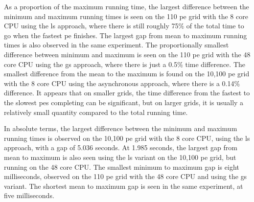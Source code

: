 As a proportion of the maximum running time, the largest difference between the minimum and maximum running times is seen on the 110 \gls{pe} grid with the 8 core CPU using the \gls{ls} approach, where there is still roughly 75\% of the total time to go when the fastest \gls{pe} finishes.  The largest gap from mean to maximum running times is also observed in the same experiment.  The proportionally smallest difference between minimum and maximum is seen on the 110 \gls{pe} grid with the 48 core CPU using the \gls{gs} approach, where there is just a 0.5\% time difference.  The smallest difference from the mean to the maximum is found on the 10,100 \gls{pe} grid with the 8 core CPU using the asynchronous approach, where there is a 0.14\% difference.  It appears that on smaller grids, the time difference from the fastest to the slowest \glspl{pe} completing can be significant, but on larger grids, it is usually a relatively small quantity compared to the total running time.

In absolute terms, the largest difference between the minimum and maximum running times is observed on the 10,100 \gls{pe} grid with the 8 core CPU, using the \gls{ls} approach, with a gap of 5.036 seconds.  At 1.985 seconds, the largest gap from mean to maximum is also seen using the \gls{ls} variant on the 10,100 \gls{pe} grid, but running on the 48 core CPU.  The smallest minimum to maximum gap is eight milliseconds, observed on the 110 \gls{pe} grid with the 48 core CPU and using the \gls{gs} variant.  The shortest mean to maximum gap is seen in the same experiment, at five milliseconds.

